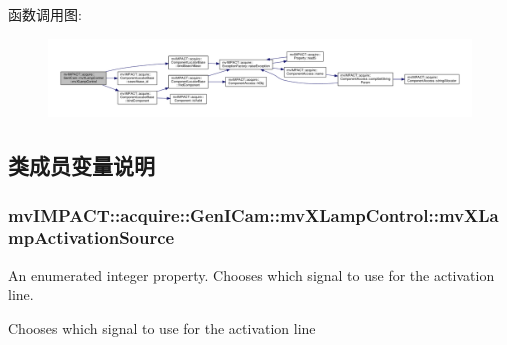 函数调用图\+:
\nopagebreak
\begin{figure}[H]
\begin{center}
\leavevmode
\includegraphics[width=350pt]{classmv_i_m_p_a_c_t_1_1acquire_1_1_gen_i_cam_1_1mv_x_lamp_control_acea184fc039bfb70ca1c0950529a92b2_cgraph}
\end{center}
\end{figure}




\subsection{类成员变量说明}
\hypertarget{classmv_i_m_p_a_c_t_1_1acquire_1_1_gen_i_cam_1_1mv_x_lamp_control_a056ba745427e59e1332327c277b89d54}{
\subsubsection[{mv\+X\+Lamp\+Activation\+Source}]{ mv\+I\+M\+P\+A\+C\+T\+::acquire\+::\+Gen\+I\+Cam\+::mv\+X\+Lamp\+Control\+::mv\+X\+Lamp\+Activation\+Source}}\label{classmv_i_m_p_a_c_t_1_1acquire_1_1_gen_i_cam_1_1mv_x_lamp_control_a056ba745427e59e1332327c277b89d54}


An enumerated integer property. Chooses which signal to use for the activation line. 

Chooses which signal to use for the activation line

